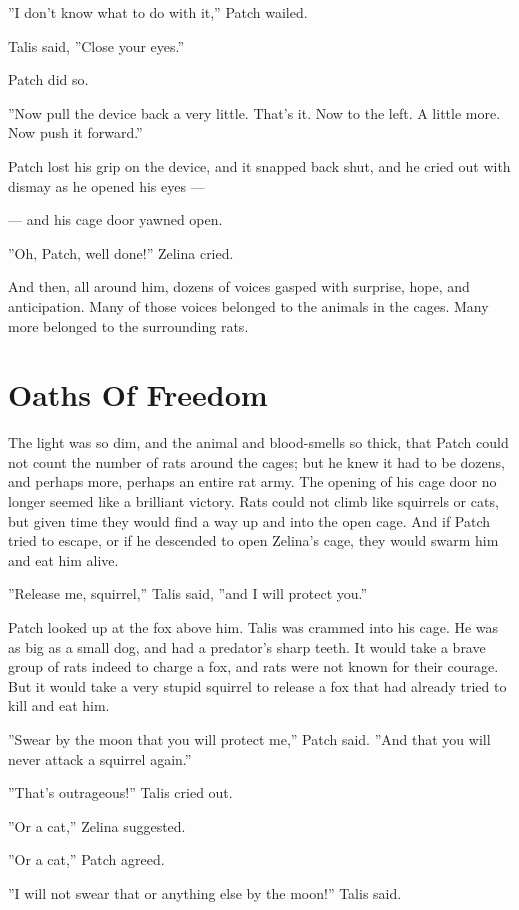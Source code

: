 \documentclass[12pt]{book}
\begin{document}
''I don't know what to do with it,'' Patch wailed.

Talis said, ''Close your eyes.''

Patch did so.

''Now pull the device back a very little. That's it. Now to the left. A little more. Now push it forward.''

Patch lost his grip on the device, and it snapped back shut, and he cried out with dismay as he opened his eyes ---

---
and his cage door yawned open.

''Oh, Patch, well done!'' Zelina cried.

And then, all around him, dozens of voices gasped with surprise, hope, and anticipation. Many of those voices belonged to the animals in the cages. Many more belonged to the surrounding rats.


\section{Oaths Of Freedom}

The light was so dim, and the animal and blood-smells so thick, that Patch could not count the number of rats around the cages; but he knew it had to be dozens, and perhaps more, perhaps an entire rat army. The opening of his cage door no longer seemed like a brilliant victory. Rats could not climb like squirrels or cats, but given time they would find a way up and into the open cage. And if Patch tried to escape, or if he descended to open Zelina's cage, they would swarm him and eat him alive.

''Release me, squirrel,'' Talis said, ''and I will protect you.''

Patch looked up at the fox above him. Talis was crammed into his cage. He was as big as a small dog, and had a predator's sharp teeth. It would take a brave group of rats indeed to charge a fox, and rats were not known for their courage. But it would take a very stupid squirrel to release a fox that had already tried to kill and eat him.

''Swear by the moon that you will protect me,'' Patch said. ''And that you will never attack a squirrel again.''

''That's outrageous!'' Talis cried out.

''Or a cat,'' Zelina suggested.

''Or a cat,'' Patch agreed.

''I will not swear that or anything else by the moon!'' Talis said.
\end{document}
